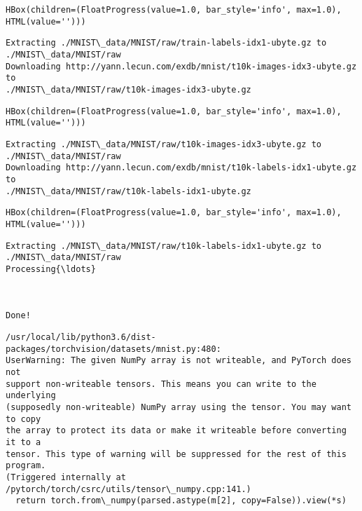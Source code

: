 \documentclass[11pt]{article}
\begin{document}
    
    \begin{verbatim}
HBox(children=(FloatProgress(value=1.0, bar_style='info', max=1.0), HTML(value='')))
    \end{verbatim}

    
    \begin{Verbatim}[commandchars=\\\{\}]
Extracting ./MNIST\_data/MNIST/raw/train-labels-idx1-ubyte.gz to
./MNIST\_data/MNIST/raw
Downloading http://yann.lecun.com/exdb/mnist/t10k-images-idx3-ubyte.gz to
./MNIST\_data/MNIST/raw/t10k-images-idx3-ubyte.gz
    \end{Verbatim}

    
    \begin{verbatim}
HBox(children=(FloatProgress(value=1.0, bar_style='info', max=1.0), HTML(value='')))
    \end{verbatim}

    
    \begin{Verbatim}[commandchars=\\\{\}]
Extracting ./MNIST\_data/MNIST/raw/t10k-images-idx3-ubyte.gz to
./MNIST\_data/MNIST/raw
Downloading http://yann.lecun.com/exdb/mnist/t10k-labels-idx1-ubyte.gz to
./MNIST\_data/MNIST/raw/t10k-labels-idx1-ubyte.gz
    \end{Verbatim}

    
    \begin{verbatim}
HBox(children=(FloatProgress(value=1.0, bar_style='info', max=1.0), HTML(value='')))
    \end{verbatim}

    
    \begin{Verbatim}[commandchars=\\\{\}]
Extracting ./MNIST\_data/MNIST/raw/t10k-labels-idx1-ubyte.gz to
./MNIST\_data/MNIST/raw
Processing{\ldots}



Done!
    \end{Verbatim}

    \begin{Verbatim}[commandchars=\\\{\}]
/usr/local/lib/python3.6/dist-packages/torchvision/datasets/mnist.py:480:
UserWarning: The given NumPy array is not writeable, and PyTorch does not
support non-writeable tensors. This means you can write to the underlying
(supposedly non-writeable) NumPy array using the tensor. You may want to copy
the array to protect its data or make it writeable before converting it to a
tensor. This type of warning will be suppressed for the rest of this program.
(Triggered internally at  /pytorch/torch/csrc/utils/tensor\_numpy.cpp:141.)
  return torch.from\_numpy(parsed.astype(m[2], copy=False)).view(*s)
    \end{Verbatim}
\end{document}
